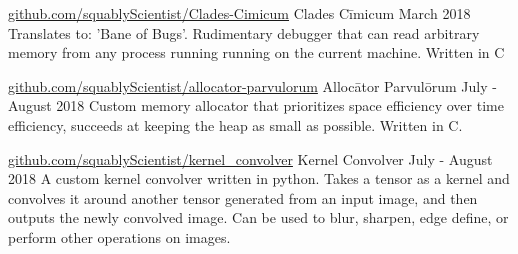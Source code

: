 \documentclass{awesome-cv}
\begin{document}
		\begin{cventries}
			\cventry
				{\href{https://github.com/squablyScientist/Clades-Cimicum}{github.com/squablyScientist/Clades-Cimicum}}
				{Clades Cīmicum}
				{March 2018}
				{}
				{Translates to: 'Bane of Bugs'. Rudimentary debugger that can read arbitrary memory from any process running running on the current machine. Written in C}

			\cventry
				{\href{https://github.com/squablyScientist/allocator-parvulorum}{github.com/squablyScientist/allocator-parvulorum}}
				{Allocātor Parvulōrum}
				{July - August 2018}
				{}
				{Custom memory allocator that prioritizes space efficiency over time efficiency, succeeds at keeping the heap as small as possible. Written in C.}

            \cventry
                {\href{https://github.com/squablyScientist/kernel_convolver}{github.com/squablyScientist/kernel\_convolver}}
                {Kernel Convolver}
                {July - August 2018}
                {}
                {A custom kernel convolver written in python. Takes a tensor as a kernel and convolves it around another tensor generated from an input image, and then outputs the newly convolved image. Can be used to blur, sharpen, edge define, or perform other operations on images.}


		\end{cventries}
	\vspace{0.5cm}
\end{document}
